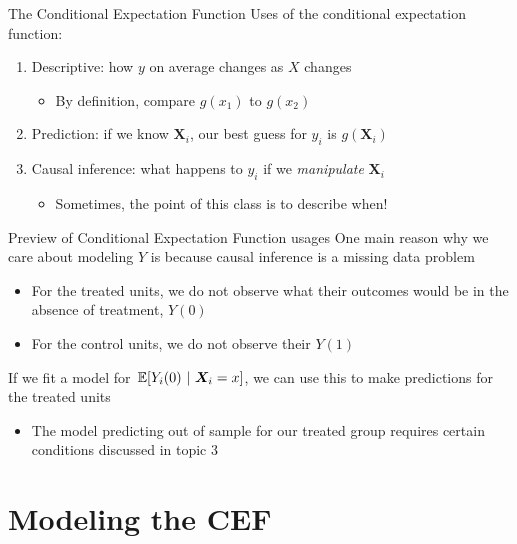 \documentclass[aspectratio=169,t,11pt,table]{beamer}
\begin{document}
\begin{frame}{The Conditional Expectation Function}
  Uses of the conditional expectation function:
  \begin{enumerate}
    \item \alert{Descriptive}: how $y$ on average changes as $X$ changes 
    \begin{itemize}
      \item By definition, compare $g(x_1)$ to $g(x_2)$
    \end{itemize} 

    \bigskip
    \item \alert{Prediction}: if we know $\bm{X}_i$, our best guess for $y_i$ is $g(\bm{X}_i)$ 
    
    \bigskip
    \item \alert{Causal inference}: what happens to $y_i$ if we \emph{manipulate} $\bm{X}_i$ 
    \begin{itemize}
      \item Sometimes, the point of this class is to describe when! 
    \end{itemize}
  \end{enumerate}
\end{frame}


\begin{frame}{Preview of Conditional Expectation Function usages}
  One main reason why we care about modeling $Y$ is because causal inference is a missing data problem
  \begin{itemize}
    \item For the treated units, we do not observe what their outcomes would be in the absence of treatment, $Y(0)$
    \item For the control units, we do not observe their $Y(1)$
  \end{itemize}

  \pause
  \bigskip
  If we fit a model for $\expec{Y_i(0)}{\bm{X}_i = x}$, we can use this to make predictions for the treated units 
  
  \pause
  \begin{itemize}
    \item The model predicting out of sample for our treated group requires certain conditions discussed in topic 3
  \end{itemize}
\end{frame}

\section{Modeling the CEF}
\end{document}
